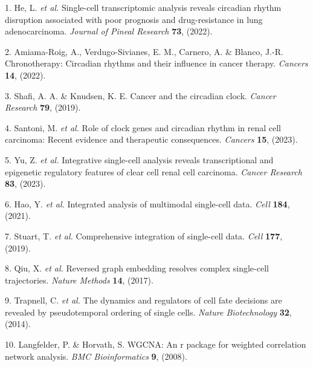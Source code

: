 \documentclass[
]{article}
\newenvironment{cslreferences}%
  {}%
  {\par}
\begin{document}
\hypertarget{refs}{}
\begin{cslreferences}
\leavevmode\hypertarget{ref-SingleCellTraHeLe2022}{}%
1. He, L. \emph{et al.} Single-cell transcriptomic analysis reveals circadian rhythm disruption associated with poor prognosis and drug-resistance in lung adenocarcinoma. \emph{Journal of Pineal Research} \textbf{73}, (2022).

\leavevmode\hypertarget{ref-ChronotherapyAmiama2022}{}%
2. Amiama-Roig, A., Verdugo-Sivianes, E. M., Carnero, A. \& Blanco, J.-R. Chronotherapy: Circadian rhythms and their influence in cancer therapy. \emph{Cancers} \textbf{14}, (2022).

\leavevmode\hypertarget{ref-CancerAndTheShafi2019}{}%
3. Shafi, A. A. \& Knudsen, K. E. Cancer and the circadian clock. \emph{Cancer Research} \textbf{79}, (2019).

\leavevmode\hypertarget{ref-RoleOfClockGSanton2023}{}%
4. Santoni, M. \emph{et al.} Role of clock genes and circadian rhythm in renal cell carcinoma: Recent evidence and therapeutic consequences. \emph{Cancers} \textbf{15}, (2023).

\leavevmode\hypertarget{ref-IntegrativeSinYuZh2023}{}%
5. Yu, Z. \emph{et al.} Integrative single-cell analysis reveals transcriptional and epigenetic regulatory features of clear cell renal cell carcinoma. \emph{Cancer Research} \textbf{83}, (2023).

\leavevmode\hypertarget{ref-IntegratedAnalHaoY2021}{}%
6. Hao, Y. \emph{et al.} Integrated analysis of multimodal single-cell data. \emph{Cell} \textbf{184}, (2021).

\leavevmode\hypertarget{ref-ComprehensiveIStuart2019}{}%
7. Stuart, T. \emph{et al.} Comprehensive integration of single-cell data. \emph{Cell} \textbf{177}, (2019).

\leavevmode\hypertarget{ref-ReversedGraphQiuX2017}{}%
8. Qiu, X. \emph{et al.} Reversed graph embedding resolves complex single-cell trajectories. \emph{Nature Methods} \textbf{14}, (2017).

\leavevmode\hypertarget{ref-TheDynamicsAnTrapne2014}{}%
9. Trapnell, C. \emph{et al.} The dynamics and regulators of cell fate decisions are revealed by pseudotemporal ordering of single cells. \emph{Nature Biotechnology} \textbf{32}, (2014).

\leavevmode\hypertarget{ref-WgcnaAnRPacLangfe2008}{}%
10. Langfelder, P. \& Horvath, S. WGCNA: An r package for weighted correlation network analysis. \emph{BMC Bioinformatics} \textbf{9}, (2008).


\end{cslreferences}
\end{document}
